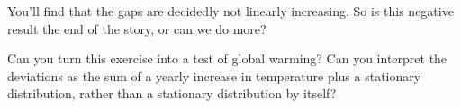 You'll find that the gaps are decidedly not linearly increasing.
So is this negative result the end of the story, or can we do more?

\begin{exercise}
  Can you turn this exercise into a test of global warming? Can you
  interpret the deviations as the sum of a yearly increase in temperature
  plus a stationary distribution, rather than a stationary
  distribution by itself?
\end{exercise}
